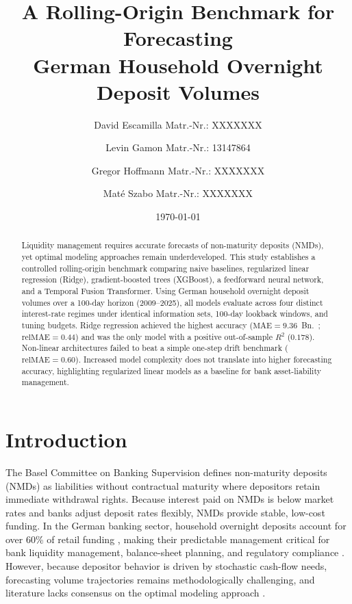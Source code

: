 \documentclass[11pt,a4paper]{article}
\title{\textbf{A Rolling-Origin Benchmark for Forecasting\\
German Household Overnight Deposit Volumes}}
\author[1]{David Escamilla \small Matr.-Nr.: XXXXXXX}
\author[1]{Levin Gamon \small Matr.-Nr.: 13147864}
\author[1]{Gregor Hoffmann \small Matr.-Nr.: XXXXXXX}
\author[1]{Mat\'e Szabo \small Matr.-Nr.: XXXXXXX}
\affil[1]{LMU Munich School of Management, Institute of AI in Management}
\date{\today}
\begin{document}
\maketitle

\begin{abstract}
    \noindent Liquidity management requires accurate forecasts of non-maturity
    deposits (NMDs), yet optimal modeling approaches remain underdeveloped.
    This study establishes a controlled rolling-origin benchmark comparing
    naive baselines, regularized linear regression (Ridge), gradient-boosted
    trees (XGBoost), a feedforward neural network, and a Temporal Fusion
    Transformer. Using German household overnight deposit volumes over a
    100-day horizon (2009--2025), all models evaluate across four distinct
    interest-rate regimes under identical information sets, 100-day lookback
    windows, and tuning budgets. Ridge regression achieved the highest
    accuracy ($\text{MAE} = 9.36$~Bn.~\texteuro; $\text{relMAE} = 0.44$) and
    was the only model with a positive out-of-sample $R^2$ ($0.178$).
    Non-linear architectures failed to beat a simple one-step drift benchmark
    ($\text{relMAE} = 0.60$). Increased model complexity does not translate into
    higher forecasting accuracy, highlighting regularized linear models as a
    baseline for bank asset-liability management.
\end{abstract}

\newpage
\tableofcontents
\newpage

\section{Introduction}
\label{sec:introduction}

The Basel Committee on Banking Supervision \citep{bcbs2016irrbb} defines
non-maturity deposits (NMDs) as liabilities without contractual maturity
where depositors retain immediate withdrawal rights. Because interest paid on
NMDs is below market rates and banks adjust deposit rates flexibly, NMDs
provide stable, low-cost funding. In the German banking sector, household
overnight deposits account for over 60\% of retail funding
\citep{schlueter2015bank}, making their predictable management critical for bank
liquidity management, balance-sheet planning, and regulatory compliance
\citep{ecb2011monetary}. However, because depositor behavior is driven by
stochastic cash-flow needs, forecasting volume trajectories remains
methodologically challenging, and literature lacks consensus on the optimal
modeling approach \citep{winkler2025, marena2022nonmaturing}.
\end{document}
